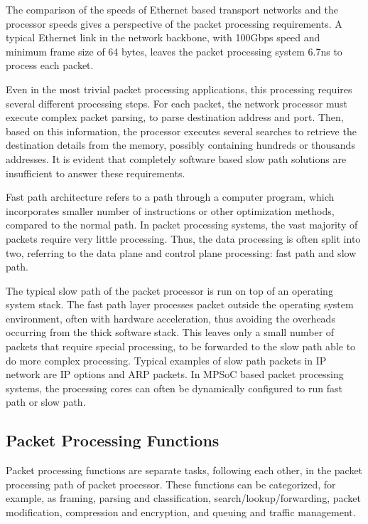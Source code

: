 The comparison of the speeds of Ethernet based transport networks and the processor speeds gives a perspective of the packet processing requirements. A typical Ethernet link in the network backbone, with 100Gbps speed and minimum frame size of 64 bytes, leaves the packet processing system 6.7ns to process each packet.~\cite{Giladi:2008:Network}

Even in the most trivial packet processing applications, this processing requires several different processing steps. For each packet, the network processor must execute complex packet parsing, to parse destination address and port. Then, based on this information, the processor executes several searches to retrieve the destination details from the memory, possibly containing hundreds or thousands addresses. It is evident that completely software based slow path solutions are insufficient to answer these requirements.~\cite{Giladi:2008:Network}

Fast path architecture refers to a path through a computer program, which incorporates smaller number of instructions or other optimization methods, compared to the normal path. In packet processing systems, the vast majority of packets require very little processing. Thus, the data processing is often split into two, referring to the data plane and control plane processing: fast path and slow path.~\cite{6wind:2016:FP, Giladi:2008:Network}

The typical slow path of the packet processor is run on top of an operating system stack. The fast path layer processes packet outside the operating system environment, often with hardware acceleration, thus avoiding the overheads occurring from the thick software stack. This leaves only a small number of packets that require special processing, to be forwarded to the slow path able to do more complex processing. Typical examples of slow path packets in IP network are IP options and ARP packets. In MPSoC based packet processing systems, the processing cores can often be dynamically configured to run fast path or slow path.~\cite{6wind:2016:FP, Giladi:2008:Network}

\subsection{Packet Processing Functions}
Packet processing functions are separate tasks, following each other, in the packet processing path of packet processor. These functions can be categorized, for example, as framing, parsing and classification, search/lookup/forwarding, packet modification, compression and encryption, and queuing and traffic management.~\cite{Giladi:2008:Network}

